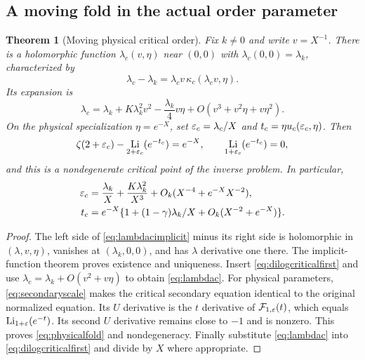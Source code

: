 \documentclass[11pt,a4paper]{article}
\numberwithin{equation}{section}
\newtheorem{theorem}{Theorem}[section]
\theoremstyle{definition}\newtheorem{definition}[theorem]{Definition}
\theoremstyle{remark}\newtheorem{remark}[theorem]{Remark}
\DeclareMathOperator{\Li}{Li}
\newcommand{\F}{\mathcal F}\newcommand{\B}{\mathcal B}
\begin{document}
\subsection{A moving fold in the actual order parameter}
\begin{theorem}[Moving physical critical order]\label{thm:movingfold}
Fix $k\ne0$ and write $v=X^{-1}$. There is a holomorphic function
$\lambda_c(v,\eta)$ near $(0,0)$ with $\lambda_c(0,0)=\lambda_k$,
characterized by
\begin{equation}\label{eq:lambdacimplicit}
 \lambda_c-\lambda_k
       =\lambda_cv\,\kappa_c(\lambda_cv,\eta).
\end{equation}
Its expansion is
\begin{equation}\label{eq:lambdac}
 \lambda_c=\lambda_k+K\lambda_k^2v^2
       -\frac{\lambda_k}{4}v\eta
       +O(v^3+v^2\eta+v\eta^2).
\end{equation}
On the physical specialization $\eta=e^{-X}$, set
$\varepsilon_c=\lambda_c/X$ and
$t_c=\eta u_c(\varepsilon_c,\eta)$. Then
\begin{equation}\label{eq:physicalfold}
 \zeta(2+\eps_c)-\Li_{2+\eps_c}(e^{-t_c})=e^{-X},
 \qquad \Li_{1+\eps_c}(e^{-t_c})=0,
\end{equation}
and this is a nondegenerate critical point of the inverse problem. In
particular,
\begin{align}
 \varepsilon_c&=\frac{\lambda_k}{X}+\frac{K\lambda_k^2}{X^3}
                      +O_k(X^{-4}+e^{-X}X^{-2}),\label{eq:epsc}\\
 t_c&=e^{-X}\{1+(1-\gamma)\lambda_k/X
                               +O_k(X^{-2}+e^{-X})\}.\label{eq:tc}
\end{align}
\end{theorem}
\begin{proof}
The left side of \eqref{eq:lambdacimplicit} minus its right side is
holomorphic in $(\lambda,v,\eta)$, vanishes at $(\lambda_k,0,0)$, and
has $\lambda$ derivative one there. The implicit-function theorem proves
existence and uniqueness. Insert \eqref{eq:dilogcriticalfirst} and use
$\lambda_c=\lambda_k+O(v^2+v\eta)$ to obtain \eqref{eq:lambdac}.
For physical parameters, \eqref{eq:secondaryscale} makes the critical
secondary equation identical to the original normalized equation. Its
$U$ derivative is the $t$ derivative of $\F_{1,\eps}(t)$, which equals
$\Li_{1+\eps}(e^{-t})$. Its second $U$ derivative remains close to $-1$
and is nonzero. This proves \eqref{eq:physicalfold} and nondegeneracy.
Finally substitute \eqref{eq:lambdac} into \eqref{eq:dilogcriticalfirst}
and divide by $X$ where appropriate.
\end{proof}
\end{document}
